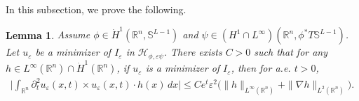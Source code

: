 \documentclass[12pt,twoside,reqno]{amsart}
\newtheorem{lemma}[theorem]{Lemma}
\theoremstyle{definition}              %
\theoremstyle{remark}                  %
\newcommand{\eps}{\varepsilon}
\renewcommand{\1}{\mathbbm{1}}                                      %
\numberwithin{equation}{section}
\numberwithin{definition}{section}
\numberwithin{theorem}{section}
\numberwithin{remark}{section}
\begin{document}
In this subsection, we prove the following.

\begin{lemma} \label{dualestimate} Assume $\phi\in \dot{H}^1(\mathbb R^n,\mathbb S^{L-1})$ 
and $\psi\in ({H}^1\cap L^\infty)(\mathbb R^n,\mathbb \phi^*T\mathbb{S}^{L-1})$.
Let $u_\eps$ be a minimizer of $I_\eps$ in $\mathcal{H}_{\phi,\eps\psi}$. There exists  $C>0$ such that for any $h\in L^\infty(\mathbb{R}^n)\cap \dot{H}^1(\mathbb{R}^n)$, if
$u_\eps$ is a minimizer of $I_\eps$, then for a.e. $t>0$, 
\begin{align}\label{dual_est}
 \Big|\int_{\mathbb{R}^n} 
 \partial_t^2u_\eps(x,t)\times u_\eps(x,t)\cdot h(x)\,dx\Big|\le Ce^{t}\eps^2\Big(\|h\|_{L^\infty(\mathbb {R}^n)}+\|\nabla h\|_{L^2(\mathbb{R}^n)}\Big).
\end{align}    
\end{lemma}
\end{document}
